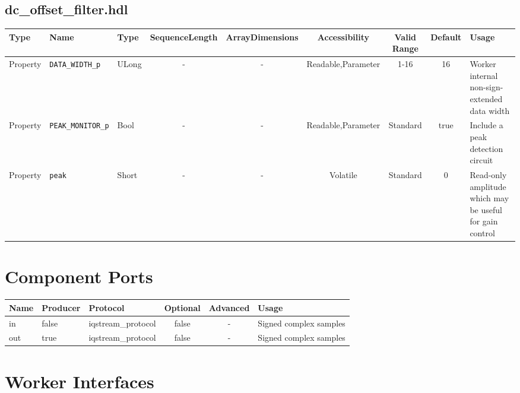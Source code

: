 \documentclass{article}
\def\comp{dc\_offset\_filter}
\begin{document}
\begin{landscape}
		\subsection*{\comp.hdl}
		\begin{scriptsize}
			\begin{tabular}{|p{3cm}|p{2cm}|p{1cm}|c|c|c|c|c|p{5cm}|}
				\hline
				\rowcolor{blue}
				Type     & Name                  & Type  & SequenceLength & ArrayDimensions & Accessibility      & Valid Range & Default & Usage                                                    \\
				\hline
				Property & \verb+DATA_WIDTH_p+   & ULong & -              & -               & Readable,Parameter & 1-16        & 16      & Worker internal non-sign-extended data width             \\
				\hline
				Property & \verb+PEAK_MONITOR_p+ & Bool  & -              & -               & Readable,Parameter & Standard    & true    & Include a peak detection circuit                         \\
				\hline
				Property & \verb+peak+           & Short & -              & -               & Volatile           & Standard    & 0       & Read-only amplitude which may be useful for gain control \\
				\hline
			\end{tabular}
		\end{scriptsize}

		\section*{Component Ports}
		\begin{scriptsize}
			\begin{tabular}{|M{2cm}|M{1.5cm}|M{4cm}|c|c|M{9cm}|}
				\hline
				\rowcolor{blue}
				Name & Producer & Protocol           & Optional & Advanced & Usage                  \\
				\hline
				in   & false    & iqstream\_protocol & false    & -        & Signed complex samples \\
				\hline
				out  & true     & iqstream\_protocol & false    & -        & Signed complex samples \\
				\hline
			\end{tabular}
		\end{scriptsize}

		\section*{Worker Interfaces}

\end{landscape}
\end{document}
